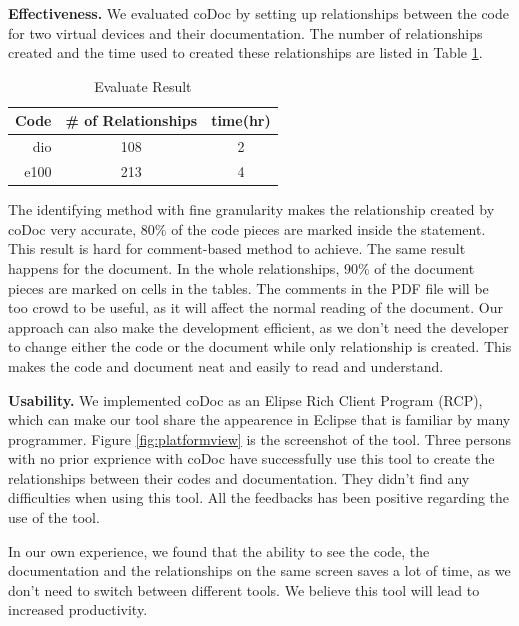 \documentclass[runningheads,a4paper]{llncs}
\begin{document}
\textbf{Effectiveness.} We evaluated coDoc by setting up relationships between the code for two virtual devices and their documentation.
The number of relationships created and the time used to created these relationships are listed in Table \ref{table:evaluate}.

\begin{table}[th]
\caption{Evaluate Result}
\centering
\begin{tabular}{rcc}
\hline
Code & \# of Relationships & time(hr) \\
\hline
dio & 108 & 2 \\
e100  & 213 & 4\\
\hline
\end{tabular}
\label{table:evaluate}
\end{table}

The identifying method with fine granularity makes the relationship created by coDoc very accurate, 
80\% of the code pieces are marked inside the statement.
This result is hard for comment-based method to achieve.
The same result happens for the document.
In the whole relationships, 
90\% of the document pieces are marked on cells in the tables.
The comments in the PDF file will be too crowd to be useful,
as it will affect the normal reading of the document.
Our approach can also make the development efficient,
as we don't need the developer to change either the code or the document while only relationship is created.
This makes the code and document neat and easily to read and understand.

\noindent \textbf{Usability.} We implemented coDoc as an Elipse Rich Client Program (RCP), 
which can make our tool share the appearence in Eclipse that is familiar by many programmer.
Figure \ref{fig:platformview} is the screenshot of the tool.
Three persons with no prior exprience with coDoc have successfully use this tool to create the relationships between their codes and documentation.
They didn't find any difficulties when using this tool.
All the feedbacks has been positive regarding the use of the tool.

In our own experience, we found that the ability to see the code, 
the documentation and the relationships on the same screen saves a lot of time,
as we don't need to switch between different tools.
We believe this tool will lead to increased productivity.
\end{document}
